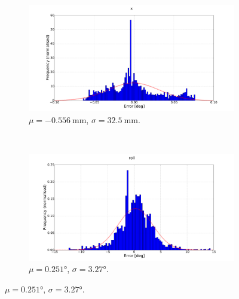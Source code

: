 \begin{figure}
  \begin{subfigure}{0.48\textwidth}
    \includegraphics[clip, trim = 120 0 120 0, width=\textwidth]{figures/chapter3/norm_x}
    \caption{$\mu = \SI{-0.556}{\mm}$, $\sigma = \SI{32.5}{\mm}$.}
    \label{fig:chap3-err-norm-x}
  \end{subfigure}
~
  \begin{subfigure}{0.48\textwidth}
     \includegraphics[clip, trim = 120 0 120 0, width=\textwidth]{figures/chapter3/norm_roll}
     \caption{$\mu = \ang{0.251}$, $\sigma = \ang{3.27}$.}
  \label{fig:norm-roll}
  \end{subfigure}


\end{figure}
